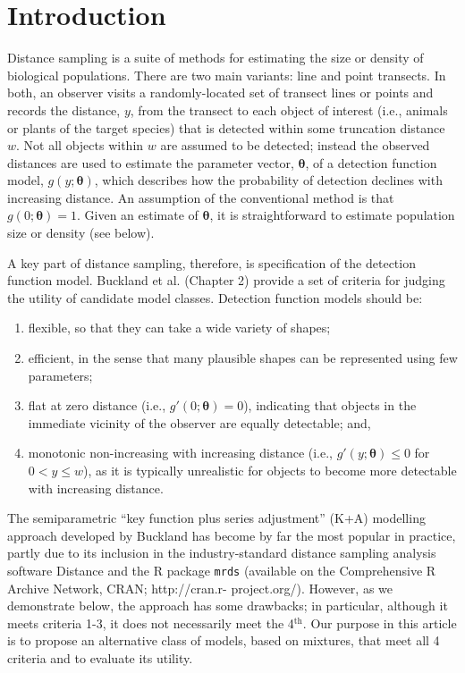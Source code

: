 \documentclass[10pt]{article}
\begin{document}
\section*{Introduction}

Distance sampling \cite{Buckland:2001vm,Buckland:2004ts} is a suite of methods for estimating the size or density of biological populations.  There are two main variants: line and point transects. In both, an observer visits a randomly-located set of transect lines or points and records the distance, $y$, from the transect to each object of interest (i.e., animals or plants of the target species) that is detected within some truncation distance $w$.  Not all objects within $w$ are assumed to be detected; instead the observed distances are used to estimate the parameter vector, $\boldsymbol{\theta}$, of a detection function model, $g(y;\boldsymbol{\theta})$, which describes how the probability of detection declines with increasing distance.  An assumption of the conventional method is that $g(0;\boldsymbol{\theta})=1$. Given an estimate of $\boldsymbol{\theta}$, it is straightforward to estimate population size or density (see below).

A key part of distance sampling, therefore, is specification of the detection function model. Buckland et al. (Chapter 2) \cite{Buckland:2001vm} provide a set of criteria for judging the utility of candidate model classes. Detection function models should be:
\begin{enumerate}
\item flexible, so that they can take a wide variety of shapes;
\item efficient, in the sense that many plausible shapes can be represented using few parameters;
\item flat at zero distance (i.e., $g'(0;\boldsymbol{\theta})=0$), indicating that objects in the immediate vicinity of the observer are equally detectable; and,
\item monotonic non-increasing with increasing distance (i.e., $g'(y;\boldsymbol{\theta}) \leq 0$ for $0<y\leq w$), as it is typically unrealistic for objects to become more detectable with increasing distance.
\end{enumerate}
The semiparametric ``key function plus series adjustment'' (K+A) modelling approach developed by Buckland \cite{Buckland:1992wy} has become by far the most popular in practice, partly due to its inclusion in the industry-standard distance sampling analysis software Distance \cite{Thomas:2010cf} and the \textsf{R} package \texttt{mrds} \cite{mrds} (available on the Comprehensive R Archive Network, CRAN; http://cran.r- project.org/).  However, as we demonstrate below, the approach has some drawbacks; in particular, although it meets criteria 1-3, it does not necessarily meet the 4$^\text{th}$.  Our purpose in this article is to propose an alternative class of models, based on mixtures, that meet all 4 criteria and to evaluate its utility.  
\end{document}
